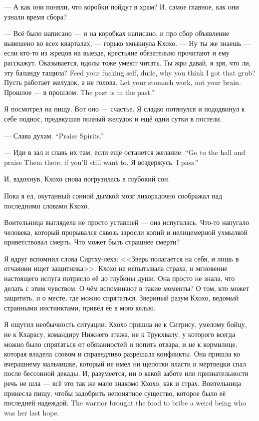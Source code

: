 --- А как они поняли, что коробки пойдут в храм?
И, самое главное, как они узнали время сбора?

--- Всё было написано --- и на коробках написано, и про сбор объявление вывешено во всех кварталах, --- горько хмыкнула Кхохо.
--- Ну ты же знаешь --- если кто-то из жрецов на выезде, крестьяне обязательно прочитают и ему расскажут.
Оказывается, идолы тоже умеют читать.
{Ты жри давай, я зря, что ли, эту баланду тащила?}
{Feed your fucking self, dude, why you think I got that grub?}
{Пусть работает желудок, а не голова.}
{Let your stomach work, not your brain.}
{Прошлое --- в прошлом.}
{The past is in the past.''}

Я посмотрел на пищу.
Вот оно --- счастье.
Я сладко потянулся и пододвинул к себе поднос, предвкушая полный желудок и ещё одни сутки в постели.

{--- Слава духам.}
{``Praise Spirits.''}

{--- Иди в зал и славь их там, если ещё останется желание.}
{``Go to the hall and praise Them there, if you'll still want to.}
{Я воздержусь.}
{I pass.''}

И, вздохнув, Кхохо снова погрузилась в глубокий сон.

\asterism

Пока я ел, окутанный сонной дымкой мозг лихорадочно соображал над последними словами Кхохо.

Воительница выглядела не просто уставшей --- она испугалась.
Что-то напугало человека, который прорывался сквозь заросли копий и нелицемерной ухмылкой приветствовал смерть.
Что может быть страшнее смерти?

Я вдруг вспомнил слова Сиртху-лехэ: <<Зверь полагается на себя, и лишь в отчаянии ищет защитника>>.
Кхохо не испытывала страха, и мгновение настоящего испуга потрясло её до глубины души.
Она просто не знала, что делать с этим чувством.
О чём вспоминают в такие моменты?
О том, кто может защитить, и о месте, где можно спрятаться.
Звериный разум Кхохо, ведомый странными инстинктами, привёл её в мою келью.

Я ощутил необычность ситуации.
Кхохо пришла не к Ситрису, умелому бойцу, не к Кхарасу, командиру Нижнего этажа, не к Трукхвалу, у которого всегда можно было спрятаться от обязанностей и попить отвара, и не к кормилице, которая владела словом и справедливо разрешала конфликты.
Она пришла ко вчерашнему мальчишке, который не имел ни щепотки власти и мертвецки спал после бессонной декады.
И, разумеется, ни о какой заботе или признательности речь не шла --- всё это так же мало знакомо Кхохо, как и страх.
{Воительница принесла пищу, чтобы задобрить непонятное существо, которое было её последней надеждой.}
{The warrior brought the food to bribe a weird being who was her last hope.}

